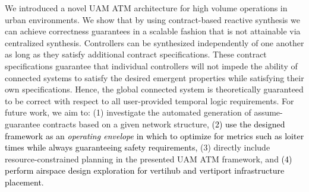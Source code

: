 We introduced a novel UAM ATM architecture for high volume operations in urban environments. We show that by using contract-based reactive synthesis we can achieve  correctness guarantees in a scalable fashion that is not attainable via centralized synthesis. Controllers can be synthesized independently of one another as long as they satisfy additional contract specifications. These contract specifications guarantee that individual controllers will not impede the ability of connected systems to satisfy the desired emergent properties while satisfying their own specifications. Hence, the global connected system is theoretically guaranteed to be correct with respect to all user-provided temporal logic requirements. For future work, we aim to: (1) investigate the automated generation of assume-guarantee contracts based on a given network structure, \textcolor{black}{(2) use the designed framework as an \emph{ operating envelope} in which to optimize for metrics such as loiter times while always guaranteeing safety requirements,} (3) directly include resource-constrained planning in the presented UAM ATM framework, and \textcolor{black}{(4) perform airspace design exploration for vertihub and vertiport infrastructure placement}. 

\begin{table}[t!]
	\centering
	\caption{Synthesis times for vertihub/vertiport controllers}
	\label{tab:hubsyntime}
	\centering
\end{table}
